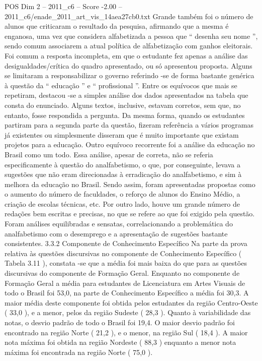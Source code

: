 \begin{textsample}{POS Dim 2 – 2011\_c6 – Score -2.00 – 2011\_c6/enade\_2011\_art\_vis\_14aea27cb0.txt}
Grande também foi o número de alunos que criticaram o resultado da pesquisa, afirmando que a mesma é enganosa, uma vez que considera alfabetizada a pessoa que “ desenha seu nome ”, sendo comum associarem a atual política de alfabetização com ganhos eleitorais.
Foi comum a resposta incompleta, em que o estudante fez apenas a análise das desigualdades/crítica do quadro apresentado, ou só apresentou proposta.
Alguns se limitaram a responsabilizar o governo referindo -se de forma bastante genérica à questão da “ educação ” e “ profissional ”.
Entre os equívocos que mais se repetiram, destacou -se a simples análise dos dados apresentados na tabela que consta do enunciado.
Alguns textos, inclusive, estavam corretos, sem que, no entanto, fosse respondida a pergunta.
Da mesma forma, quando os estudantes partiram para a segunda parte da questão, fizeram referência a vários programas já existentes ou simplesmente disseram que é muito importante que existam projetos para a educação.
Outro equívoco recorrente foi a análise da educação no Brasil como um todo.
Essa análise, apesar de correta, não se referia especificamente à questão do analfabetismo, o que, por conseguinte, levava a sugestões que não eram direcionadas à erradicação do analfabetismo, e sim à melhora da educação no Brasil.
Sendo assim, foram apresentadas propostas como o aumento do número de faculdades, o reforço de alunos do Ensino Médio, a criação de escolas técnicas, etc.
Por outro lado, houve um grande número de redações bem escritas e precisas, no que se refere ao que foi exigido pela questão.
Foram análises equilibradas e sensatas, correlacionando a problemática do analfabetismo com o desemprego e a apresentação de sugestões bastante consistentes. 3.3.2 Componente de Conhecimento Específico Na parte da prova relativa às questões discursivas no componente de Conhecimento Específico ( Tabela 3.11 ), constata -se que a média foi mais baixa do que para as questões discursivas do componente de Formação Geral.
Enquanto no componente de Formação Geral a média para estudantes de Licenciatura em Artes Visuais de todo o Brasil foi 53,0, na parte de Conhecimento Específico a média foi 30,3.
A maior média deste componente foi obtida pelos estudantes da região Centro-Oeste ( 33,0 ), e a menor, pelos da região Sudeste ( 28,3 ).
Quanto à variabilidade das notas, o desvio padrão de todo o Brasil foi 19,4.
O maior desvio padrão foi encontrado na região Norte ( 21,2 ), e o menor, na região Sul ( 18,4 ).
A maior nota máxima foi obtida na região Nordeste ( 88,3 ) enquanto a menor nota máxima foi encontrada na região Norte ( 75,0 ).

\end{textsample}
